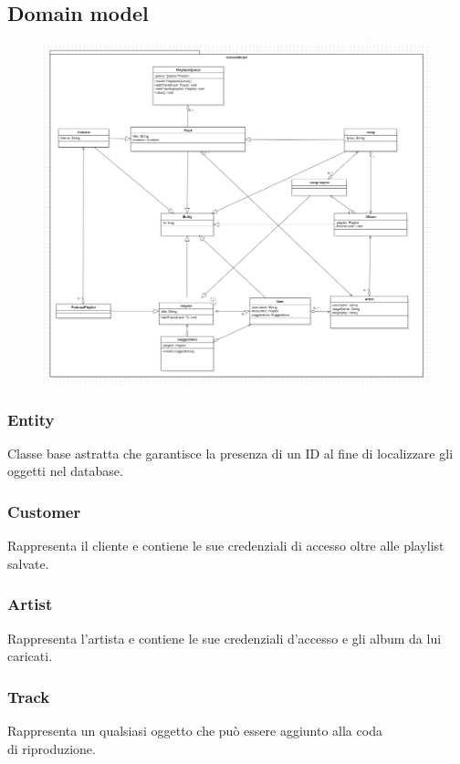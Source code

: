 \documentclass{article}
\begin{document}
  \subsection{Domain model}

  \begin{figure}[H]
    \includegraphics[scale=0.4]{model01}
  \end{figure}

  \subsubsection{Entity}
  Classe base astratta che garantisce la presenza di un ID al fine di localizzare gli oggetti nel database.

  \subsubsection{Customer}
  Rappresenta il cliente e contiene le sue credenziali di accesso oltre alle playlist salvate.

  \subsubsection{Artist}
  Rappresenta l'artista e contiene le sue credenziali d'accesso e gli album da lui caricati.

  \subsubsection{Track}
  Rappresenta un qualsiasi oggetto che può essere aggiunto alla coda\\ di riproduzione.
\end{document}

